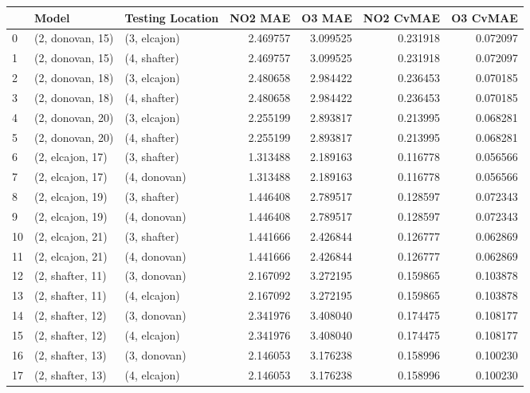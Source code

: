 \begin{tabular}{lllrrrr}
\toprule
{} &             Model & Testing Location &   NO2 MAE &    O3 MAE &  NO2 CvMAE &  O3 CvMAE \\
\midrule
0  &  (2, donovan, 15) &     (3, elcajon) &  2.469757 &  3.099525 &   0.231918 &  0.072097 \\
1  &  (2, donovan, 15) &     (4, shafter) &  2.469757 &  3.099525 &   0.231918 &  0.072097 \\
2  &  (2, donovan, 18) &     (3, elcajon) &  2.480658 &  2.984422 &   0.236453 &  0.070185 \\
3  &  (2, donovan, 18) &     (4, shafter) &  2.480658 &  2.984422 &   0.236453 &  0.070185 \\
4  &  (2, donovan, 20) &     (3, elcajon) &  2.255199 &  2.893817 &   0.213995 &  0.068281 \\
5  &  (2, donovan, 20) &     (4, shafter) &  2.255199 &  2.893817 &   0.213995 &  0.068281 \\
6  &  (2, elcajon, 17) &     (3, shafter) &  1.313488 &  2.189163 &   0.116778 &  0.056566 \\
7  &  (2, elcajon, 17) &     (4, donovan) &  1.313488 &  2.189163 &   0.116778 &  0.056566 \\
8  &  (2, elcajon, 19) &     (3, shafter) &  1.446408 &  2.789517 &   0.128597 &  0.072343 \\
9  &  (2, elcajon, 19) &     (4, donovan) &  1.446408 &  2.789517 &   0.128597 &  0.072343 \\
10 &  (2, elcajon, 21) &     (3, shafter) &  1.441666 &  2.426844 &   0.126777 &  0.062869 \\
11 &  (2, elcajon, 21) &     (4, donovan) &  1.441666 &  2.426844 &   0.126777 &  0.062869 \\
12 &  (2, shafter, 11) &     (3, donovan) &  2.167092 &  3.272195 &   0.159865 &  0.103878 \\
13 &  (2, shafter, 11) &     (4, elcajon) &  2.167092 &  3.272195 &   0.159865 &  0.103878 \\
14 &  (2, shafter, 12) &     (3, donovan) &  2.341976 &  3.408040 &   0.174475 &  0.108177 \\
15 &  (2, shafter, 12) &     (4, elcajon) &  2.341976 &  3.408040 &   0.174475 &  0.108177 \\
16 &  (2, shafter, 13) &     (3, donovan) &  2.146053 &  3.176238 &   0.158996 &  0.100230 \\
17 &  (2, shafter, 13) &     (4, elcajon) &  2.146053 &  3.176238 &   0.158996 &  0.100230 \\

\end{tabular}
